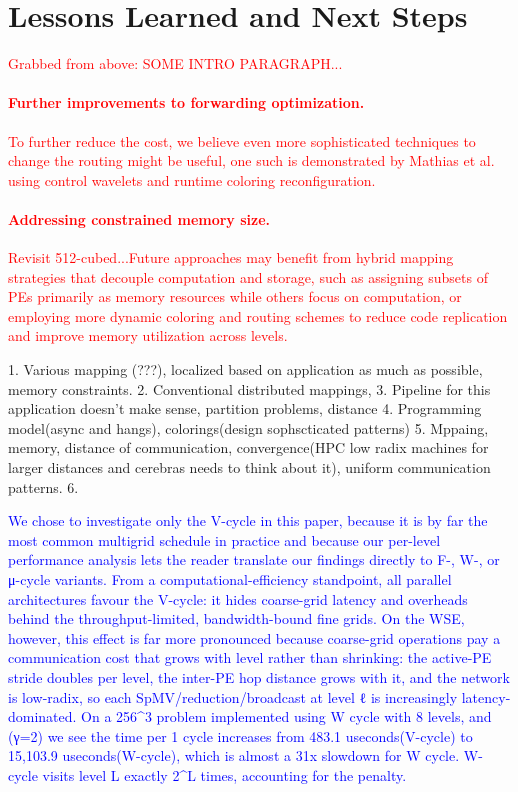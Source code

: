 \documentclass[sigconf]{acmart}
\begin{document}
\section{Lessons Learned and Next Steps}
\textcolor{red}{Grabbed from above: 
SOME INTRO PARAGRAPH...
\paragraph{Further improvements to forwarding optimization.}
To further reduce the cost, we believe even more
sophisticated techniques to change the routing might be useful, one
such is demonstrated by Mathias et al.~\cite{mathias} using control wavelets and runtime coloring reconfiguration.
\paragraph{Addressing constrained memory size.}
Revisit 512-cubed...Future approaches may benefit from hybrid mapping strategies that decouple computation and storage, such as assigning subsets of PEs primarily as memory resources while others focus on computation, or employing more dynamic coloring and routing schemes to reduce code replication and improve memory utilization across levels.}

1. Various mapping (???), localized based on application as much as possible, memory constraints.
2. Conventional distributed mappings, 
3. Pipeline for this application doesn't make sense, partition problems, distance 
4. Programming model(async and hangs), colorings(design sophscticated patterns)
5. Mppaing, memory, distance of communication, convergence(HPC low radix machines for larger distances and cerebras needs to think about it), uniform communication patterns. 
6. 

\textcolor{blue}{
We chose to investigate only the V-cycle in this paper, because it is by far the most common multigrid schedule in practice and because our per-level performance analysis lets the reader translate our findings directly to F-, W-, or μ-cycle variants. From a computational-efficiency standpoint, all parallel    architectures favour the V-cycle: it hides coarse-grid latency and overheads behind the throughput-limited, bandwidth-bound fine grids. On the WSE, however, this effect is far more pronounced because coarse-grid operations pay a communication cost that grows with level rather than shrinking: the active-PE stride doubles per level, the inter-PE hop distance grows with it, and the network is low-radix, so each SpMV/reduction/broadcast at level ℓ is increasingly latency-dominated. On a 256^3 problem implemented using W cycle with 8 levels, and (γ=2) we see the time per 1 cycle increases from 483.1 useconds(V-cycle) to 15,103.9 useconds(W-cycle), which is almost a 31x slowdown for W cycle. W-cycle visits level L exactly 2^L times, accounting for the penalty. 

}
\end{document}
